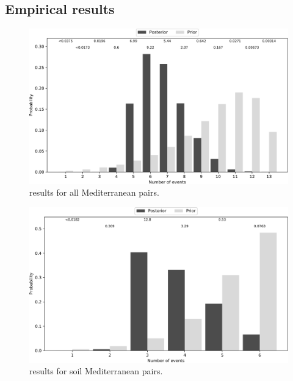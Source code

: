 \documentclass[letterpaper,12pt]{article}
\begin{document}
\subsection{Empirical results}


\begin{figure}[htbp]
    \begin{center}
        \includegraphics[width=\textwidth,height=\textheight,keepaspectratio]{../images/from-project-repo/empirical-plots/mediterranean-all-pairs/pyco-sumevents-mediterranean-all-pairs-pycoevolity-nevents-cropped.pdf}
        \caption{
            \Ecoevolity results for all Mediterranean pairs.
        }
        \label{fig:neventsmediall}
    \end{center}
\end{figure}

\begin{figure}[htbp]
    \begin{center}
        \includegraphics[width=\textwidth,height=\textheight,keepaspectratio]{../images/from-project-repo/empirical-plots/mediterranean-soil-pairs/pyco-sumevents-mediterranean-soil-pairs-pycoevolity-nevents-cropped.pdf}
        \caption{
            \Ecoevolity results for soil Mediterranean pairs.
        }
        \label{fig:neventsmedisoil}
    \end{center}
\end{figure}
\end{document}
